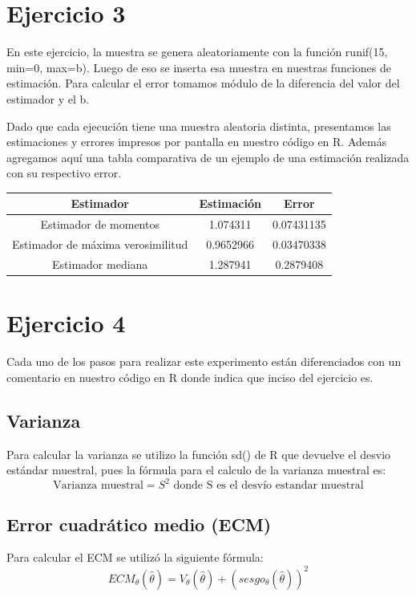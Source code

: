\documentclass[a4paper]{article}
\begin{document}
\section{Ejercicio 3}
En este ejercicio, la muestra se genera aleatoriamente con la función runif(15, min=0, max=b). Luego de eso se inserta esa muestra en nuestras funciones de estimación.
Para calcular el error tomamos módulo de la diferencia del valor del estimador y el b. 

Dado que cada ejecución tiene una muestra aleatoria distinta, presentamos las estimaciones y errores impresos por pantalla en nuestro código en R. Además agregamos aquí una tabla comparativa de un ejemplo de una estimación realizada con su respectivo error. 

\begin{center}
 \begin{tabular}{||c | c | c||} 
 \hline
 Estimador & Estimación  & Error \\ [0.5ex] 
 \hline\hline
 Estimador de momentos & 1.074311 & 0.07431135 \\ 
 \hline
 Estimador de máxima verosimilitud & 0.9652966 & 0.03470338 \\
 \hline
 Estimador mediana & 1.287941 & 0.2879408 \\ [1ex] 
 \hline
\end{tabular}
\end{center}

\section{Ejercicio 4}
Cada uno de los pasos para realizar este experimento están diferenciados con un comentario en nuestro código en R donde indica que inciso del ejercicio es.
\subsection{Varianza}
Para calcular la varianza se utilizo la función sd() de R que devuelve el desvio estándar muestral, pues la fórmula para el calculo de la varianza muestral es:
\[
\textrm{Varianza muestral} = S^2 \textrm{ donde S es el desvío estandar muestral}
\]
\subsection{Error cuadrático medio (ECM)}
Para calcular el ECM se utilizó la siguiente fórmula:
\[
ECM_\theta(\hat{\theta}) = V_\theta(\hat{\theta}) + (sesgo_\theta(\hat{\theta}))^2
\]
\end{document}
